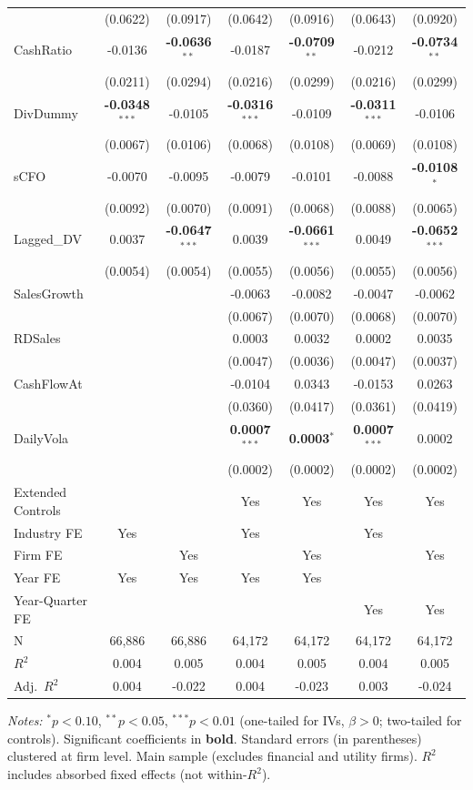 \documentclass[11pt,a4paper]{article}
\begin{document}
\begin{table}[htbp]
\begin{tabular}{lcccccc}
 & (0.0622) & (0.0917) & (0.0642) & (0.0916) & (0.0643) & (0.0920) \\
CashRatio & -0.0136 & \textbf{-0.0636}$^{**}$ & -0.0187 & \textbf{-0.0709}$^{**}$ & -0.0212 & \textbf{-0.0734}$^{**}$ \\
 & (0.0211) & (0.0294) & (0.0216) & (0.0299) & (0.0216) & (0.0299) \\
DivDummy & \textbf{-0.0348}$^{***}$ & -0.0105 & \textbf{-0.0316}$^{***}$ & -0.0109 & \textbf{-0.0311}$^{***}$ & -0.0106 \\
 & (0.0067) & (0.0106) & (0.0068) & (0.0108) & (0.0069) & (0.0108) \\
sCFO & -0.0070 & -0.0095 & -0.0079 & -0.0101 & -0.0088 & \textbf{-0.0108}$^{*}$ \\
 & (0.0092) & (0.0070) & (0.0091) & (0.0068) & (0.0088) & (0.0065) \\
Lagged\_DV & 0.0037 & \textbf{-0.0647}$^{***}$ & 0.0039 & \textbf{-0.0661}$^{***}$ & 0.0049 & \textbf{-0.0652}$^{***}$ \\
 & (0.0054) & (0.0054) & (0.0055) & (0.0056) & (0.0055) & (0.0056) \\
SalesGrowth &  &  & -0.0063 & -0.0082 & -0.0047 & -0.0062 \\
 &  &  & (0.0067) & (0.0070) & (0.0068) & (0.0070) \\
RDSales &  &  & 0.0003 & 0.0032 & 0.0002 & 0.0035 \\
 &  &  & (0.0047) & (0.0036) & (0.0047) & (0.0037) \\
CashFlowAt &  &  & -0.0104 & 0.0343 & -0.0153 & 0.0263 \\
 &  &  & (0.0360) & (0.0417) & (0.0361) & (0.0419) \\
DailyVola &  &  & \textbf{0.0007}$^{***}$ & \textbf{0.0003}$^{*}$ & \textbf{0.0007}$^{***}$ & 0.0002 \\
 &  &  & (0.0002) & (0.0002) & (0.0002) & (0.0002) \\
\midrule
Extended Controls &  &  & Yes & Yes & Yes & Yes \\
Industry FE & Yes &  & Yes &  & Yes &  \\
Firm FE &  & Yes &  & Yes &  & Yes \\
Year FE & Yes & Yes & Yes & Yes &  &  \\
Year-Quarter FE &  &  &  &  & Yes & Yes \\
\midrule
N & 66,886 & 66,886 & 64,172 & 64,172 & 64,172 & 64,172 \\
$R^2$ & 0.004 & 0.005 & 0.004 & 0.005 & 0.004 & 0.005 \\
Adj.~$R^2$ & 0.004 & -0.022 & 0.004 & -0.023 & 0.003 & -0.024 \\
\bottomrule
\end{tabular}
\begin{minipage}{\linewidth}
\vspace{2pt}\scriptsize
\textit{Notes:} $^{*}p<0.10$, $^{**}p<0.05$, $^{***}p<0.01$ (one-tailed for IVs, $\beta > 0$; two-tailed for controls).
 Significant coefficients in \textbf{bold}.
 Standard errors (in parentheses) clustered at firm level.
 Main sample (excludes financial and utility firms).
 $R^2$ includes absorbed fixed effects (not within-$R^2$).
\end{minipage}
\end{table}
\end{document}

